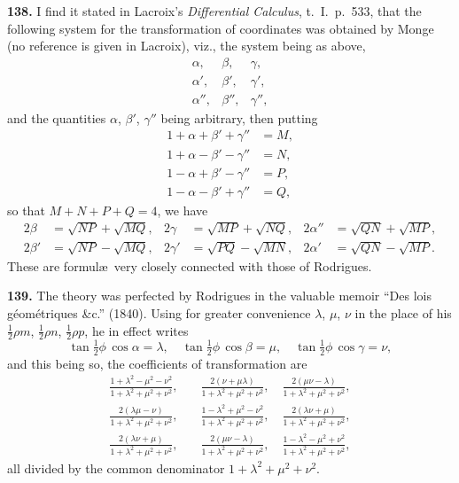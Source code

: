 \documentclass[11pt,a4paper]{book}
\begin{document}
\textbf{138.} I find it stated in Lacroix's \textit{Differential Calculus}, t.~I.~p.~533, that the following system for the transformation of coordinates was obtained by Monge (no reference is given in Lacroix), viz., the system being as above,
\[
\begin{array}{ccc}
\alpha, & \beta, & \gamma, \\
\alpha', & \beta', & \gamma', \\
\alpha'', & \beta'', & \gamma'',
\end{array}
\]
and the quantities $\alpha$, $\beta'$, $\gamma''$ being arbitrary, then putting
\begin{align*}
1 + \alpha + \beta' + \gamma'' &= M, \\
1 + \alpha - \beta' - \gamma'' &= N, \\
1 - \alpha + \beta' - \gamma'' &= P, \\
1 - \alpha - \beta' + \gamma'' &= Q,
\end{align*}
so that $M + N + P + Q = 4$, we have
\begin{align*}
2\beta &= \sqrt{NP} + \sqrt{MQ}, & 2\gamma &= \sqrt{MP} + \sqrt{NQ}, & 2\alpha'' &= \sqrt{QN} + \sqrt{MP}, \\
2\beta' &= \sqrt{NP} - \sqrt{MQ}, & 2\gamma' &= \sqrt{PQ} - \sqrt{MN}, & 2\alpha' &= \sqrt{QN} - \sqrt{MP}.
\end{align*}
These are formul\ae\ very closely connected with those of Rodrigues.

\textbf{139.} The theory was perfected by Rodrigues in the valuable memoir ``Des lois g\'eom\'etriques \&c.'' (1840). Using for greater convenience $\lambda$, $\mu$, $\nu$ in the place of his $\frac{1}{2}\rho m$, $\frac{1}{2}\rho n$, $\frac{1}{2}\rho p$, he in effect writes
\[
\tan\tfrac{1}{2}\phi\,\cos\alpha = \lambda, \quad \tan\tfrac{1}{2}\phi\,\cos\beta = \mu, \quad \tan\tfrac{1}{2}\phi\,\cos\gamma = \nu,
\]
and this being so, the coefficients of transformation are
\begin{align*}
\frac{1 + \lambda^2 - \mu^2 - \nu^2}{1 + \lambda^2 + \mu^2 + \nu^2}, &\quad \frac{2(\nu + \mu\lambda)}{1 + \lambda^2 + \mu^2 + \nu^2}, \quad \frac{2(\mu\nu - \lambda)}{1 + \lambda^2 + \mu^2 + \nu^2}, \\
\frac{2(\lambda\mu - \nu)}{1 + \lambda^2 + \mu^2 + \nu^2}, &\quad \frac{1 - \lambda^2 + \mu^2 - \nu^2}{1 + \lambda^2 + \mu^2 + \nu^2}, \quad \frac{2(\lambda\nu + \mu)}{1 + \lambda^2 + \mu^2 + \nu^2}, \\
\frac{2(\lambda\nu + \mu)}{1 + \lambda^2 + \mu^2 + \nu^2}, &\quad \frac{2(\mu\nu - \lambda)}{1 + \lambda^2 + \mu^2 + \nu^2}, \quad \frac{1 - \lambda^2 - \mu^2 + \nu^2}{1 + \lambda^2 + \mu^2 + \nu^2},
\end{align*}
all divided by the common denominator $1 + \lambda^2 + \mu^2 + \nu^2$.
\end{document}
